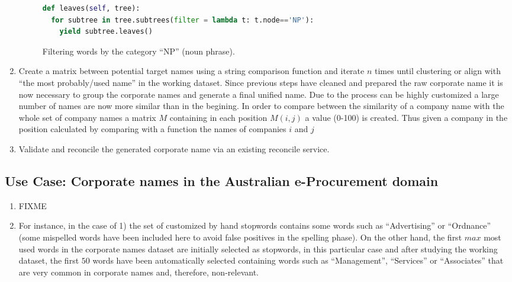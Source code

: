 \documentclass{llncs}
\begin{document}
\begin{enumerate}
 \begin{figure}[!h]
\begin{center}
\begin{lstlisting}[language=Python]  
def leaves(self, tree):
  for subtree in tree.subtrees(filter = lambda t: t.node=='NP'):
    yield subtree.leaves()
\end{lstlisting}
\caption{Filtering words by the category ``NP'' (noun phrase).}
\label{figure:step-5}
\end{center}
\end{figure}      

\item Create a matrix between potential target names using a string comparison function and 
iterate $n$ times until clustering or align with ``the most probably/used name'' 
in the working dataset. Since previous steps have cleaned and prepared the raw corporate name 
it is now necessary to group the corporate names and generate a final unified name. Due to the 
process can be highly customized a large number of names are now more similar than in 
the begining. In order to compare between the similarity of a company name with the whole set of company names 
a matrix $M$ containing in each position $M(i,j)$ a value (0-100) is created. 
Thus given a company in the position  calculated by comparing with a function the names of 
companies $i$ and $j$ 

\item Validate and reconcile the generated corporate name via an existing reconcile service.

\end{enumerate}

\subsection{Use Case: Corporate names in the Australian e-Procurement domain }
% 
\begin{enumerate}
 \item FIXME
 \item  For instance, in the case of 1) the set of customized by hand stopwords contains some words such as ``Advertising'' or ``Ordnance'' (some mispelled words 
have been included here to avoid false positives in the spelling phase). On the other hand, the first $max$ most used words in the corporate names dataset are initially selected as stopwords, 
in this particular case and after studying the working dataset, the first $50$ words have been automatically selected containing words such as ``Management'', ``Services'' or ``Associates'' that 
are very common in corporate names and, therefore, non-relevant.
\end{enumerate}
\end{document}
